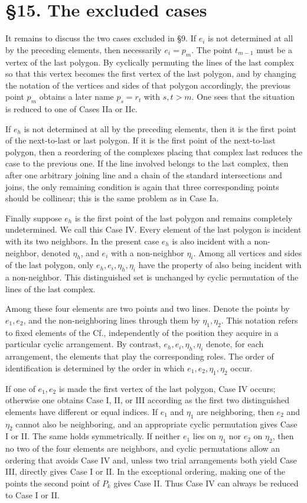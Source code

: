 \documentclass[11pt]{article}
\newcommand{\Cf}{\textup{Cf.}}
\begin{document}
\section*{\S 15. The excluded cases}
It remains to discuss the two cases excluded in \S 9. If $e_i$ is not determined at all by the preceding elements, then necessarily $e_i=p_m$. The point $t_{m-1}$ must be a vertex of the last polygon. By cyclically permuting the lines of the last complex so that this vertex becomes the first vertex of the last polygon, and by changing the notation of the vertices and sides of that polygon accordingly, the previous point $p_m$ obtains a later name $p_s=r_t$ with $s,t>m$. One sees that the situation is reduced to one of Cases IIa or IIc.

If $e_h$ is not determined at all by the preceding elements, then it is the first point of the next-to-last or last polygon. If it is the first point of the next-to-last polygon, then a reordering of the complexes placing that complex last reduces the case to the previous one. If the line involved belongs to the last complex, then after one arbitrary joining line and a chain of the standard intersections and joins, the only remaining condition is again that three corresponding points should be collinear; this is the same problem as in Case Ia.

Finally suppose $e_h$ is the first point of the last polygon and remains completely undetermined. We call this Case IV. Every element of the last polygon is incident with its two neighbors. In the present case $e_h$ is also incident with a non-neighbor, denoted $\eta_h$, and $e_i$ with a non-neighbor $\eta_i$. Among all vertices and sides of the last polygon, only $e_h,e_i,\eta_h,\eta_i$ have the property of also being incident with a non-neighbor. This distinguished set is unchanged by cyclic permutation of the lines of the last complex.

Among these four elements are two points and two lines. Denote the points by $e_1,e_2$, and the non-neighboring lines through them by $\eta_1,\eta_2$. This notation refers to fixed elements of the \Cf, independently of the position they acquire in a particular cyclic arrangement. By contrast, $e_h,e_i,\eta_h,\eta_i$ denote, for each arrangement, the elements that play the corresponding roles. The order of identification is determined by the order in which $e_1,e_2,\eta_1,\eta_2$ occur.

If one of $e_1,e_2$ is made the first vertex of the last polygon, Case IV occurs; otherwise one obtains Case I, II, or III according as the first two distinguished elements have different or equal indices. If $e_1$ and $\eta_1$ are neighboring, then $e_2$ and $\eta_2$ cannot also be neighboring, and an appropriate cyclic permutation gives Case I or II. The same holds symmetrically. If neither $e_1$ lies on $\eta_1$ nor $e_2$ on $\eta_2$, then no two of the four elements are neighbors, and cyclic permutations allow an ordering that avoids Case IV and, unless two trial arrangements both yield Case III, directly gives Case I or II. In the exceptional ordering, making one of the points the second point of $P_k$ gives Case II. Thus Case IV can always be reduced to Case I or II.
\end{document}
